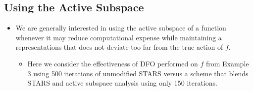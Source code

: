 \documentclass[11pt]{beamer}
\begin{document}
\subsection{Using the Active Subspace}

\begin{frame}

\begin{itemize}

	\item We are generally interested in using the active subspace of a function whenever it may reduce
computational expense while maintaining a representations that does not deviate too far from the true action of $f$. 

\begin{itemize}


	\item Here we consider the effectiveness of DFO performed on $f$ from Example 3 using 500 iterations of unmodified STARS versus a scheme that blends STARS and active subspace analysis using only 150 iterations.
	
	

\end{itemize}


\end{itemize}


\end{frame}
\end{document}

